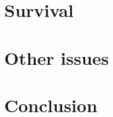 \documentclass[a4paper]{proc}
\begin{document}


  \section{Survival}


  \section{Other issues}


  \section{Conclusion}

  \printbibliography
\end{document}
